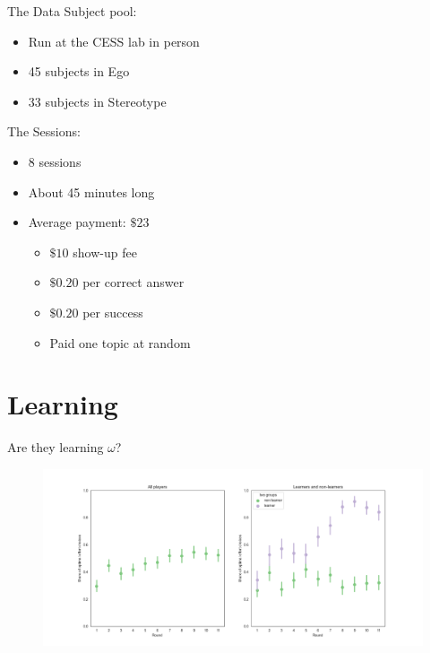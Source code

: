 \documentclass[aspectratio=169]{beamer}
\begin{document}
\begin{frame}{The Data}
    Subject pool:\\
    \begin{itemize}
        \item Run at the CESS lab in person
        \item 45 subjects in Ego
        \item 33 subjects in Stereotype
    \end{itemize}
    \bigskip
    The Sessions:
    \begin{itemize}
        \item 8 sessions 
        \item About 45 minutes long
        \item Average payment: $\$23$
        \begin{itemize}
            \item $\$10$ show-up fee
            \item $\$ 0.20$ per correct answer
            \item $\$ 0.20$ per success
            \item Paid one topic at random
        \end{itemize}
    \end{itemize}
    
\end{frame}

\section*{Learning}

\begin{frame}{Are they learning $\omega$?}
    \begin{figure}
        \centering
        \includegraphics[scale=.3]{learning_groups.png}
    \end{figure}

\end{frame}
\end{document}
